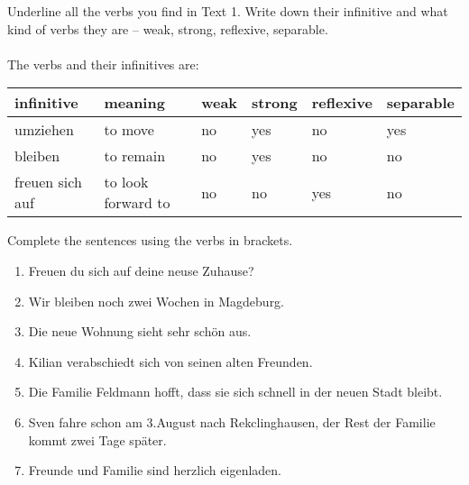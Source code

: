 \begin{exercise}
  Underline all the verbs you find in Text 1. Write down their infinitive
  and what kind of verbs they are -- weak, strong, reflexive, separable.
  \\\\
  The verbs and their infinitives are:
  \begin{center}
  \begin{tabular}{|l|l|l|l|l|l|}
    \hline
    infinitive&meaning&weak&strong&reflexive&separable\\
    \hline
    umziehen&to move&no&yes&no&yes\\
    bleiben&to remain&no&yes&no&no\\
    freuen sich auf&to look forward to&no&no&yes&no\\
    \hline
  \end{tabular}
\end{center}
\end{exercise}

\begin{exercise}
  Complete the sentences using the verbs in brackets.
  \begin{enumerate}[label=\arabic*.]
  \item Freuen du sich auf deine neuse Zuhause?
  \item Wir bleiben noch zwei Wochen in Magdeburg.
  \item Die neue Wohnung sieht sehr schön aus.
  \item Kilian verabschiedt sich von seinen alten Freunden.
  \item Die Familie Feldmann hofft, dass sie sich schnell in der neuen
    Stadt bleibt.
  \item Sven fahre schon am 3.\@ August nach Rekclinghausen, der Rest der
    Familie kommt zwei Tage später.
  \item Freunde und Familie sind herzlich eigenladen.
  \end{enumerate}
\end{exercise}



